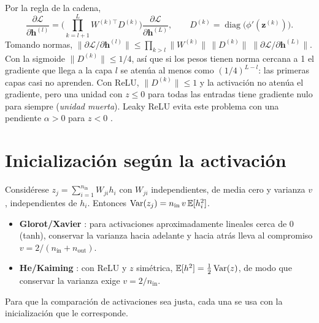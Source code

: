 Por la regla de la cadena,
\begin{equation}
\frac{\partial \mathcal{L}}{\partial \bm h^{(l)}} = \Big(\prod_{k=l+1}^{L} W^{(k)\top} D^{(k)}\Big)\frac{\partial\mathcal{L}}{\partial\bm h^{(L)}},\qquad D^{(k)} = \operatorname{diag}\big(\phi'(\bm z^{(k)})\big).
\end{equation}
Tomando normas, $\big\|\partial\mathcal L/\partial\bm h^{(l)}\big\| \le \prod_{k>l}\|W^{(k)}\|\,\|D^{(k)}\|\;\big\|\partial\mathcal L/\partial\bm h^{(L)}\big\|$. Con la sigmoide $\|D^{(k)}\|\le 1/4$, así que si los pesos tienen norma cercana a 1 el gradiente que llega a la capa $l$ se atenúa al menos como $(1/4)^{L-l}$: las primeras capas casi no aprenden. Con ReLU, $\|D^{(k)}\|\le 1$ y la activación no atenúa el gradiente, pero una unidad con $z\le 0$ para todas las entradas tiene gradiente nulo para siempre (\emph{unidad muerta}). Leaky ReLU evita este problema con una pendiente $\alpha>0$ para $z<0$ \parencite{maas2013}.

\section{Inicialización según la activación}

Considérese $z_j = \sum_{i=1}^{n_{\text{in}}} W_{ji} h_i$ con $W_{ji}$ independientes, de media cero y varianza $v$, independientes de $h_i$. Entonces $\operatorname{Var}(z_j) = n_{\text{in}}\, v\, \mathbb{E}[h_i^2]$.
\begin{itemize}
  \item \textbf{Glorot/Xavier} \parencite{glorot2010}: para activaciones aproximadamente lineales cerca de 0 (tanh), conservar la varianza hacia adelante y hacia atrás lleva al compromiso $v = 2/(n_{\text{in}} + n_{\text{out}})$.
  \item \textbf{He/Kaiming} \parencite{he2015}: con ReLU y $z$ simétrica, $\mathbb{E}[h^2] = \tfrac12\operatorname{Var}(z)$, de modo que conservar la varianza exige $v = 2/n_{\text{in}}$.
\end{itemize}
Para que la comparación de activaciones sea justa, cada una se usa con la inicialización que le corresponde.

